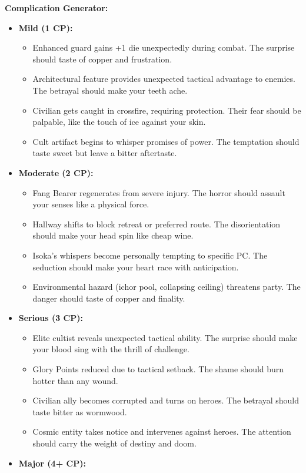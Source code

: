 \documentclass[11pt]{article}
\begin{document}
\textbf{Complication Generator:}
\begin{itemize}
\item \textbf{Mild (1 CP):} 
  \begin{itemize}
  \item Enhanced guard gains +1 die unexpectedly during combat. The surprise should taste of copper and frustration.
  \item Architectural feature provides unexpected tactical advantage to enemies. The betrayal should make your teeth ache.
  \item Civilian gets caught in crossfire, requiring protection. Their fear should be palpable, like the touch of ice against your skin.
  \item Cult artifact begins to whisper promises of power. The temptation should taste sweet but leave a bitter aftertaste.
  \end{itemize}
\item \textbf{Moderate (2 CP):}
  \begin{itemize}
  \item Fang Bearer regenerates from severe injury. The horror should assault your senses like a physical force.
  \item Hallway shifts to block retreat or preferred route. The disorientation should make your head spin like cheap wine.
  \item Isoka's whispers become personally tempting to specific PC. The seduction should make your heart race with anticipation.
  \item Environmental hazard (ichor pool, collapsing ceiling) threatens party. The danger should taste of copper and finality.
  \end{itemize}
\item \textbf{Serious (3 CP):}
  \begin{itemize}
  \item Elite cultist reveals unexpected tactical ability. The surprise should make your blood sing with the thrill of challenge.
  \item Glory Points reduced due to tactical setback. The shame should burn hotter than any wound.
  \item Civilian ally becomes corrupted and turns on heroes. The betrayal should taste bitter as wormwood.
  \item Cosmic entity takes notice and intervenes against heroes. The attention should carry the weight of destiny and doom.
  \end{itemize}
\item \textbf{Major (4+ CP):}

\end{itemize}
\end{document}
